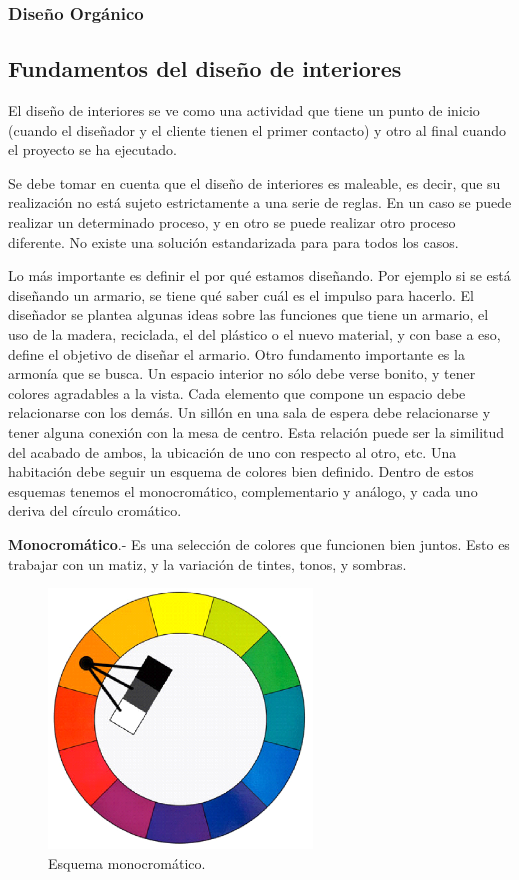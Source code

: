 \subsubsection{Diseño Orgánico}

\subsection{Fundamentos del diseño de interiores}
El diseño de interiores se ve como una actividad que tiene un punto de inicio (cuando el diseñador y el cliente tienen el primer contacto) y otro al final cuando el proyecto se ha ejecutado.\par
Se debe tomar en cuenta que el diseño de interiores es maleable, es decir, que su realización no está sujeto estrictamente a una serie de reglas. En un caso se puede realizar un determinado proceso, y en otro se puede realizar otro proceso diferente. No existe una solución estandarizada para para todos los casos.\par
Lo más importante es definir el por qué estamos diseñando. Por ejemplo si se está diseñando un armario, se tiene qué saber cuál es el impulso para hacerlo. El diseñador se plantea algunas ideas sobre las funciones que tiene un armario, el uso de la madera, reciclada, el del plástico o el nuevo material, y con base a eso, define el objetivo de diseñar el armario.
Otro fundamento importante es la armonía que se busca. Un espacio interior no sólo debe verse bonito, y tener colores agradables a la vista. Cada elemento que compone un espacio debe relacionarse con los demás. Un sillón en una sala de espera debe relacionarse y tener alguna conexión con la mesa de centro. Esta relación puede ser la similitud del acabado de ambos, la ubicación de uno con respecto al otro, etc.
Una habitación debe seguir un esquema de colores bien definido. Dentro de estos esquemas tenemos el monocromático, complementario y análogo, y cada uno deriva del círculo cromático.\par

\textbf{Monocromático}.- Es una selección de colores que funcionen bien juntos. Esto es trabajar con un matiz, y la variación de tintes, tonos, y sombras.
\begin{figure}[h!]
	\centering
	\includegraphics[width=7cm]{imagenes/marcoteorico/disenointeriores/monocromatico.png}
	\caption{Esquema monocromático.\cite{B13}}
	\label{fig:monocromatico}
\end{figure}

